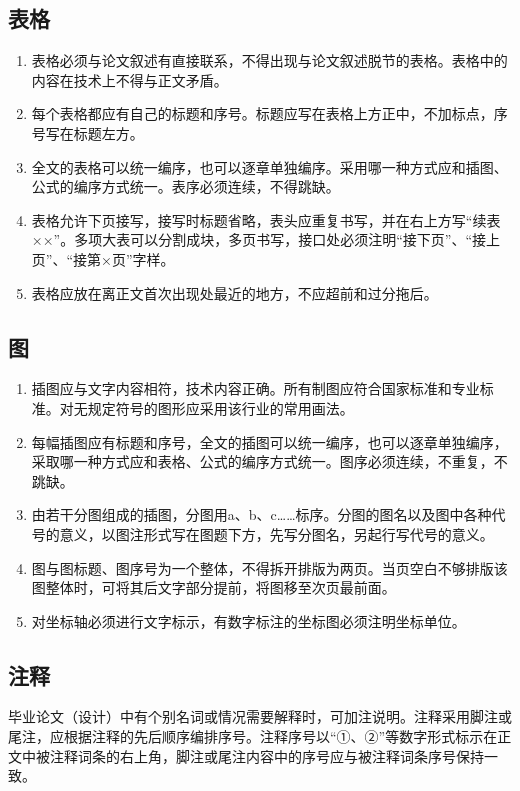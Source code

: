 \subsection{表格}

\begin{enumerate}
	\item 表格必须与论文叙述有直接联系，不得出现与论文叙述脱节的表格。表格中的内容在技术上不得与正文矛盾。
	\item 每个表格都应有自己的标题和序号。标题应写在表格上方正中，不加标点，序号写在标题左方。
	\item 全文的表格可以统一编序，也可以逐章单独编序。采用哪一种方式应和插图、公式的编序方式统一。表序必须连续，不得跳缺。
	\item 表格允许下页接写，接写时标题省略，表头应重复书写，并在右上方写“续表××”。多项大表可以分割成块，多页书写，接口处必须注明“接下页”、“接上页”、“接第×页”字样。
	\item 表格应放在离正文首次出现处最近的地方，不应超前和过分拖后。
\end{enumerate}

\subsection{图}

\begin{enumerate}
	\item 插图应与文字内容相符，技术内容正确。所有制图应符合国家标准和专业标准。对无规定符号的图形应采用该行业的常用画法。
	\item 每幅插图应有标题和序号，全文的插图可以统一编序，也可以逐章单独编序，采取哪一种方式应和表格、公式的编序方式统一。图序必须连续，不重复，不跳缺。
	\item 由若干分图组成的插图，分图用a、b、c……标序。分图的图名以及图中各种代号的意义，以图注形式写在图题下方，先写分图名，另起行写代号的意义。
	\item 图与图标题、图序号为一个整体，不得拆开排版为两页。当页空白不够排版该图整体时，可将其后文字部分提前，将图移至次页最前面。
	\item 对坐标轴必须进行文字标示，有数字标注的坐标图必须注明坐标单位。
\end{enumerate}

\subsection{注释}

毕业论文（设计）中有个别名词或情况需要解释时，可加注说明。注释采用脚注或尾注，应根据注释的先后顺序编排序号。注释序号以“①、②”等数字形式标示在正文中被注释词条的右上角，脚注或尾注内容中的序号应与被注释词条序号保持一致。

